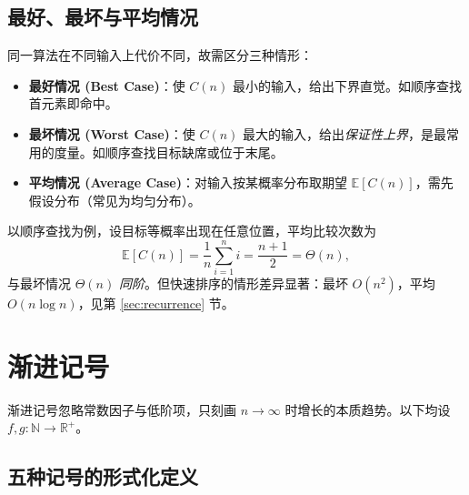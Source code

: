\subsection{最好、最坏与平均情况}

同一算法在不同输入上代价不同，故需区分三种情形：

\begin{itemize}
    \item \textbf{最好情况 (Best Case)}：使 $C(n)$ 最小的输入，给出下界直觉。如顺序查找首元素即命中。
    \item \textbf{最坏情况 (Worst Case)}：使 $C(n)$ 最大的输入，给出\emph{保证性上界}，是最常用的度量。如顺序查找目标缺席或位于末尾。
    \item \textbf{平均情况 (Average Case)}：对输入按某概率分布取期望 $\mathbb{E}[C(n)]$，需先假设分布（常见为均匀分布）。
\end{itemize}

以顺序查找为例，设目标等概率出现在任意位置，平均比较次数为
\begin{equation}
\mathbb{E}[C(n)]=\frac{1}{n}\sum_{i=1}^{n} i=\frac{n+1}{2}=\Theta(n),
\end{equation}
与最坏情况 $\Theta(n)$ \emph{同阶}。但快速排序的情形差异显著：最坏 $O(n^2)$，平均 $O(n\log n)$，见第 \ref{sec:recurrence} 节。

\section{渐进记号}

渐进记号忽略常数因子与低阶项，只刻画 $n\to\infty$ 时增长的本质趋势。以下均设 $f,g:\mathbb{N}\to\mathbb{R}^{+}$。

\subsection{五种记号的形式化定义}

